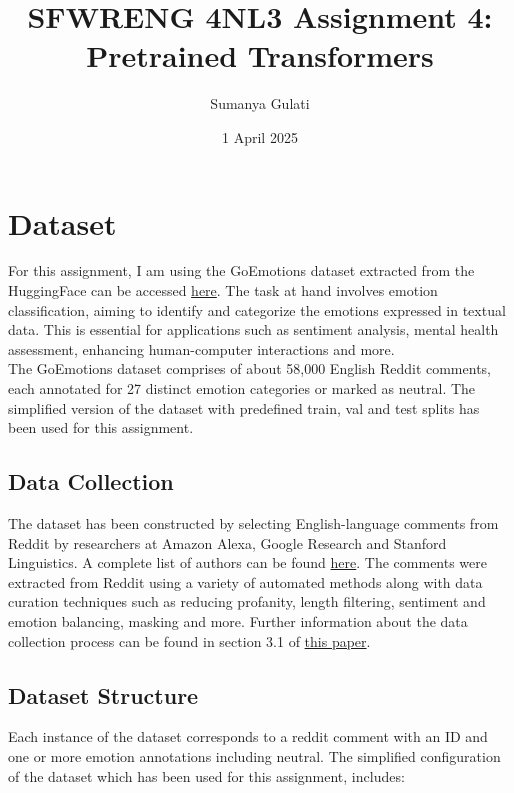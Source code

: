 \documentclass[titlepage]{article}
\title{SFWRENG 4NL3 Assignment 4: \\ Pretrained Transformers}
\author{Sumanya Gulati}
\date{1 April 2025}
\begin{document}
\begin{titlepage}
    \maketitle
\end{titlepage}

\newpage 

\tableofcontents
\listoftables
\listoffigures

\newpage

\section{Dataset}
For this assignment, I am using the GoEmotions dataset extracted from the HuggingFace can be accessed 
\href{https://huggingface.co/datasets/google-research-datasets/go_emotions}{here}. The task at hand 
involves emotion classification, aiming to identify and categorize the emotions expressed in textual data. This 
is essential for applications such as sentiment analysis, mental health assessment, enhancing human-computer 
interactions and more. \\

The GoEmotions dataset comprises of about 58,000 English Reddit comments, each annotated for 27 distinct emotion 
categories or marked as neutral. The simplified version of the dataset with predefined train, val and test splits 
has been used for this assignment. 

\subsection{Data Collection}
The dataset has been constructed by selecting English-language comments from Reddit by researchers at Amazon Alexa, 
Google Research and Stanford Linguistics. A complete list of authors can be found \href{https://arxiv.org/abs/2005.00547}
{here}. The comments were extracted from Reddit using a variety of automated methods along with data curation techniques 
such as reducing profanity, length filtering, sentiment and emotion balancing, masking and more. Further information 
about the data collection process can be found in section 3.1 of \href{https://arxiv.org/pdf/2005.00547}{this paper}.

\subsection{Dataset Structure}
Each instance of the dataset corresponds to a reddit comment with an ID and one or more emotion annotations including neutral.
The simplified configuration of the dataset which has been used for this assignment, includes:
\end{document}
